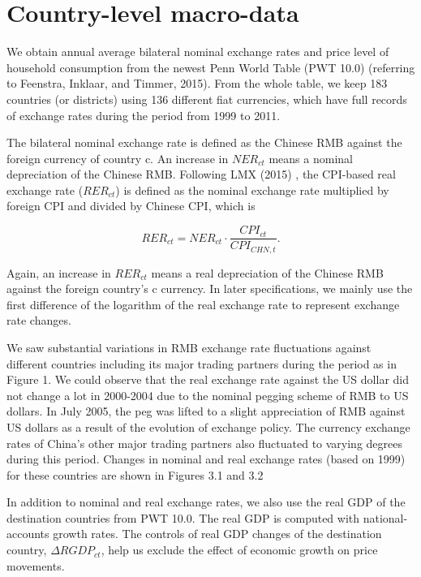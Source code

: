 \section{Country-level macro-data}

We obtain annual average bilateral nominal exchange rates and price level of household consumption from the newest Penn World Table (PWT 10.0) (referring to Feenstra, Inklaar, and Timmer, 2015\cite{feenstra2015}). From the whole table, we keep 183 countries (or districts) using 136 different fiat currencies, which have full records of exchange rates during the period from 1999 to 2011. 

The bilateral nominal exchange rate is defined as the Chinese RMB against the foreign currency of country c. An increase in $NER_{ct}$ means a nominal depreciation of the Chinese RMB. Following LMX (2015) \cite{lmx2015}, the CPI-based real exchange rate ($RER_{ct}$) is defined as the nominal exchange rate multiplied by foreign CPI and divided by Chinese CPI, which is

$$
RER_{ct}=NER_{ct} \cdot \frac{CPI_{ct}}{CPI_{CHN,t}}.
$$

Again, an increase in $RER_{ct}$ means a real depreciation of the Chinese RMB against the foreign country's c currency. In later specifications, we mainly use the first difference of the logarithm of the real exchange rate to represent exchange rate changes.

We saw substantial variations in RMB exchange rate fluctuations against different countries including its major trading partners during the period as in Figure 1.  We could observe that the real exchange rate against the US dollar did not change a lot in 2000-2004 due to the nominal pegging scheme of RMB to US dollars. In July 2005, the peg was lifted to a slight appreciation of RMB against US dollars as a result of the evolution of exchange policy. The currency exchange rates of China's other major trading partners also fluctuated to varying degrees during this period. Changes in nominal and real exchange rates (based on 1999) for these countries are shown in Figures 3.1 and 3.2

In addition to nominal and real exchange rates, we also use the real GDP of the destination countries from PWT 10.0. The real GDP is computed with national-accounts growth rates. The controls of real GDP changes of the destination country, $\Delta RGDP_{ct}$, help us exclude the effect of economic growth on price movements.

